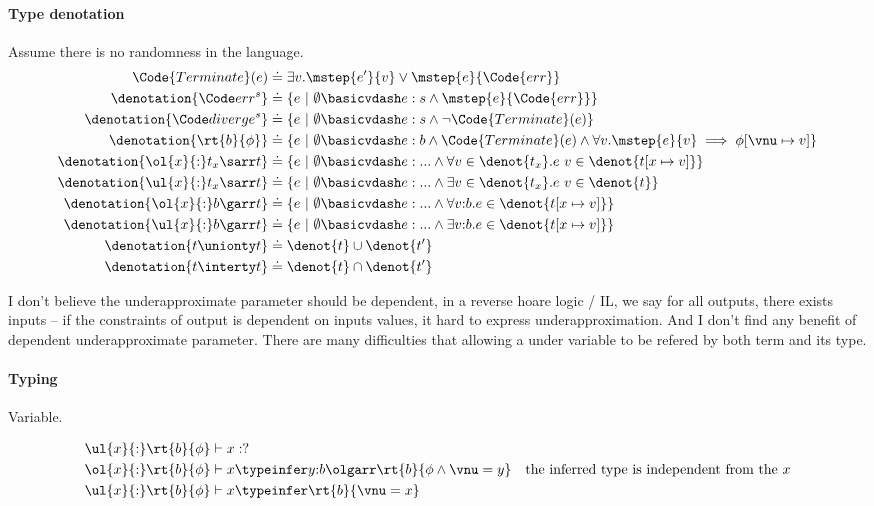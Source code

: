 \paragraph{Type denotation} Assume there is no randomness in the language.
\begin{align*}
    \Code{Terminate}(e) &\doteq \exists v. \mstep{e'}{v} \lor \mstep{e}{\Code{err}} \\
    \denotation{ \errTy{s} } &\doteq \{ e ~|~ \emptyset \basicvdash e : s \land \mstep{e}{\Code{err}} \} \\
    \denotation{ \divergeTy{s} } &\doteq \{ e ~|~ \emptyset \basicvdash e : s \land \neg \Code{Terminate}(e) \} \\
    \denotation{ \rt{b}{\phi} } &\doteq \{ e ~|~ \emptyset \basicvdash e : b \land \Code{Terminate}(e) \land \forall v. \mstep{e}{v} \implies \phi[\vnu \mapsto v] \} \\
    \denotation{ \ol{x}{:}t_x\sarr t } &\doteq \{ e ~|~ \emptyset \basicvdash e : ... \land \forall v\in\denot{t_x}. e\ v \in \denot{t[x\mapsto v]} \} \\
    \denotation{ \ul{x}{:}t_x\sarr t } &\doteq \{ e ~|~ \emptyset \basicvdash e : ... \land \exists v\in\denot{t_x}. e\ v \in \denot{t} \} \\
    \denotation{ \ol{x}{:}b\garr t } &\doteq \{ e ~|~ \emptyset \basicvdash e : ... \land \forall v{:}b. e \in \denot{t[x\mapsto v]} \} \\
    \denotation{ \ul{x}{:}b\garr t } &\doteq \{ e ~|~ \emptyset \basicvdash e : ... \land \exists v{:}b. e \in \denot{t[x\mapsto v]} \} \\
    \denotation{ t \unionty t } &\doteq \denot{t} \cup \denot{t'} \\
    \denotation{ t \interty t } &\doteq \denot{t} \cap \denot{t'}
\end{align*}

I don't believe the underapproximate parameter should be dependent, in a reverse hoare logic / IL, we say for all outputs, there exists inputs -- if the constraints of output is dependent on inputs values, it hard to express underapproximation. And I don't find any benefit of dependent underapproximate parameter. There are many difficulties that allowing a under variable to be refered by both term and its type.


\paragraph{Typing} Variable.

\begin{align*}
    \ul{x}{:}\rt{b}{\phi}  &\vdash x : ? \\
    \ol{x}{:}\rt{b}{\phi}  &\vdash x \typeinfer y{:}b\olgarr \rt{b}{\phi \land \vnu = y} \quad \text{the inferred type is independent from the $x$}\\
    \ul{x}{:}\rt{b}{\phi}  &\vdash x \typeinfer \rt{b}{\vnu = x}\\
\end{align*}